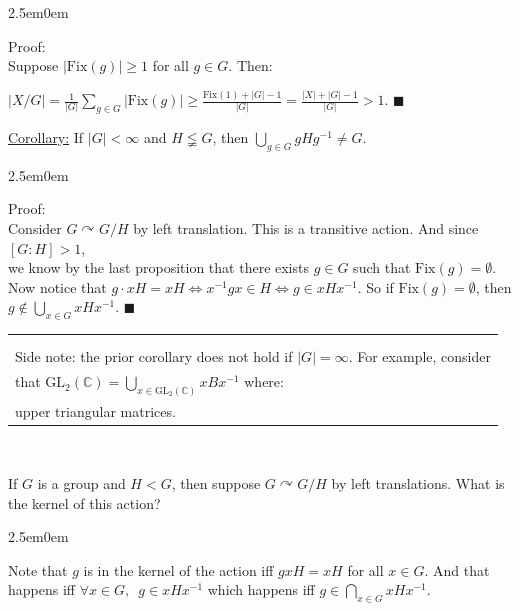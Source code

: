 \documentclass{book}
\newcommand{\hTwo}{%
\color{Black}%
   \fontsize{13}{15}\selectfont%
}
\newcommand{\hThree}{%
   \color{Black}%
   \fontsize{12}{14}\selectfont%
}
\newcommand{\pracOne}{
   \color{BrickRed}%
   \fontsize{13}{15}\selectfont%
}
\newcommand{\exThreeP}{%
   \color{RedViolet}%
   \fontsize{12}{14}\selectfont%
}
\newenvironment{myIndent}{%
   \begin{adjustwidth}{2.5em}{0em}%
}{%
   \end{adjustwidth}%
}
\newcommand{\gap}{\phantom{2}}
\newcommand{\Fix}{\mathrm{Fix}}
\newcommand{\GL}{\mathrm{GL}}
\newcommand{\mySepTwo}[1][.]{%
   {\noindent\color{#1}{\rule{6.5in}{0.5mm}}}\\%
}
\newenvironment{myClosureOne}[2][.]{%
   \color{#1}%
   \begin{tabular}{|p{#2in}|} \hline \\%
}{%
   \\ \hline \end{tabular}%
}
\newcommand{\retTwo}{\hfill\bigbreak}
\begin{document}
\begin{myIndent}\exThreeP
	Proof:\\
	Suppose $|\Fix(g)| \geq 1$ for all $g \in G$. Then:
	
	{\centering $|X/G| = \frac{1}{|G|}\sum_{g \in G} |\Fix(g)| \geq \frac{\Fix(1) + |G| - 1}{|G|} = \frac{|X| + |G| - 1}{|G|} > 1$. $\blacksquare$\retTwo\par}
\end{myIndent}

\ul{Corollary:} If $|G| < \infty$ and $H \lneqq G$, then $\bigcup_{g \in G} gHg^{-1} \neq G$.

\begin{myIndent}\exThreeP
	Proof:\\
	Consider $G \curvearrowright G/H$ by left translation. This is a transitive action. And since $[G : H] > 1$,\\ we know by the last proposition that there exists $g \in G$ such that $\Fix(g) = \emptyset$. Now notice that $g \cdot xH = xH \Longleftrightarrow x^{-1}gx \in H \Longleftrightarrow g \in xHx^{-1}$. So if $\Fix(g) = \emptyset$, then $g \notin \bigcup_{x \in G} xHx^{-1}$. $\blacksquare$\retTwo

	\pracOne
	\begin{myClosureOne}{6}
	\\ [-25pt] 
	Side note: the prior corollary does not hold if $|G| = \infty$. For example, consider\\ that $\GL_2(\mathbb{C}) = \bigcup_{x \in \GL_2(\mathbb{C})} xBx^{-1}$ where:
	
	{\centering$B \coloneqq \left\{\begin{bmatrix}
	a & b \\ 0 & c
	\end{bmatrix} \in \mathbb{C}^{2 \times 2} : a, b \neq 0\right\}$ is the set of all invertible\\ [-8pt]
	\phantom{aaaaaaaaaaaaaaaaaaaaaaaaaaaaaaaaaaa} upper triangular matrices.\retTwo\par}
	\end{myClosureOne}\retTwo
\end{myIndent}

\hTwo\mySepTwo\newpage

If $G$ is a group and $H < G$, then suppose $G \curvearrowright G/ H$ by left translations. What is the kernel of this action?
\begin{myIndent}\hThree
	Note that $g$ is in the kernel of the action iff $gxH = xH$ for all $x \in G$. And that happens iff $\forall x \in G, \gap g \in xHx^{-1}$ which happens iff $g \in \bigcap_{x \in G} xHx^{-1}$.\retTwo
\end{myIndent}
\end{document}
